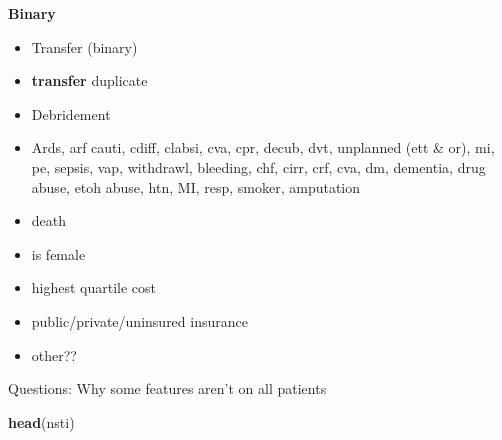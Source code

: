 \documentclass[]{article}
\newenvironment{Shaded}{\begin{snugshade}}{\end{snugshade}}
\newcommand{\KeywordTok}[1]{\textcolor[rgb]{0.13,0.29,0.53}{\textbf{#1}}}
\newcommand{\NormalTok}[1]{#1}
\providecommand{\tightlist}{%
  \setlength{\itemsep}{0pt}\setlength{\parskip}{0pt}}
\begin{document}
\textbf{Binary}

\begin{itemize}
\tightlist
\item
  Transfer (binary)
\item
  \textbf{transfer} duplicate
\item
  Debridement
\item
  Ards, arf cauti, cdiff, clabsi, cva, cpr, decub, dvt, unplanned (ett
  \& or), mi, pe, sepsis, vap, withdrawl, bleeding, chf, cirr, crf, cva,
  dm, dementia, drug abuse, etoh abuse, htn, MI, resp, smoker,
  amputation
\item
  death
\item
  is female
\item
  highest quartile cost
\item
  public/private/uninsured insurance
\item
  other??
\end{itemize}

Questions: Why some features aren't on all patients

\begin{Shaded}
\begin{Highlighting}[]
\KeywordTok{head}\NormalTok{(nsti)}
\end{Highlighting}
\end{Shaded}
\end{document}
